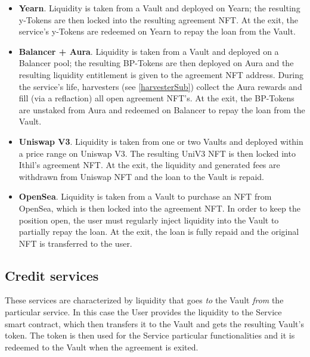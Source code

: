 \documentclass[a4paper,10 pt]{article}
\theoremstyle{definition}
\begin{document}
\begin{itemize}
\item {\bf Yearn}. Liquidity is taken from a Vault and deployed on Yearn; the resulting y-Tokens are then locked into the resulting agreement NFT. At the exit, the service's y-Tokens are redeemed on Yearn to repay the loan from the Vault.

\item {\bf Balancer + Aura}. Liquidity is taken from a Vault and deployed on a Balancer pool; the resulting BP-Tokens are then deployed on Aura and the resulting liquidity entitlement is given to the agreement NFT address. During the service's life, harvesters (see \ref{harvesterSub}) collect the Aura rewards and fill (via a reflaction) all open agreement NFT's. At the exit, the BP-Tokens are unstaked from Aura and redeemed on Balancer to repay the loan from the Vault.

\item {\bf Uniswap V3}. Liquidity is taken from one or two Vaults and deployed within a price range on Uniswap V3. The resulting UniV3 NFT is then locked into Ithil's agreement NFT. At the exit, the liquidity and generated fees are withdrawn from Uniswap NFT and the loan to the Vault is repaid.

\item {\bf OpenSea}. Liquidity is taken from a Vault to purchase an NFT from OpenSea, which is then locked into the agreement NFT. In order to keep the position open, the user must regularly inject liquidity into the Vault to partially repay the loan. At the exit, the loan is fully repaid and the original NFT is transferred to the user.
\end{itemize}
\subsection{Credit services}

These services are characterized by liquidity that goes {\it to} the Vault {\it from} the particular service. In this case the User provides the liquidity to the Service smart contract, which then transfers it to the Vault and gets the resulting Vault's token. The token is then used for the Service particular functionalities and it is redeemed to the Vault when the agreement is exited.
\end{document}
